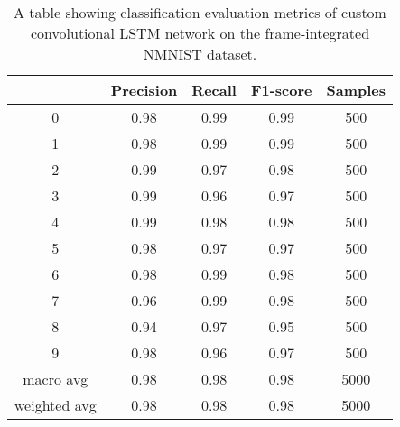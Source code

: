 \begin{table}[htb]
    \centering
    \begin{tabular}{|| c | c | c | c | c ||}
        \hline
             & Precision & Recall & F1-score & Samples \\
        \hline \hline
        0            & 0.98 & 0.99 & 0.99 & 500  \\
        \hline
        1            & 0.98 & 0.99 & 0.99 & 500  \\
        \hline
        2            & 0.99 & 0.97 & 0.98 & 500  \\
        \hline
        3            & 0.99 & 0.96 & 0.97 & 500  \\
        \hline
        4            & 0.99 & 0.98 & 0.98 & 500  \\
        \hline
        5            & 0.98 & 0.97 & 0.97 & 500  \\
        \hline
        6            & 0.98 & 0.99 & 0.98 & 500  \\
        \hline
        7            & 0.96 & 0.99 & 0.98 & 500  \\
        \hline
        8            & 0.94 & 0.97 & 0.95 & 500  \\
        \hline
        9            & 0.98 & 0.96 & 0.97 & 500  \\
        \hline
        macro avg    & 0.98 & 0.98 & 0.98 & 5000 \\
        \hline
        weighted avg & 0.98 & 0.98 & 0.98 & 5000 \\
        \hline
    \end{tabular}
    \caption{A table showing classification evaluation metrics of custom convolutional LSTM network on the frame-integrated NMNIST dataset.}
    \label{tab:custom_conv_lstm_nmnist_evaluation_metrics}
\end{table}

